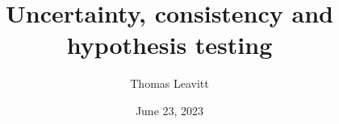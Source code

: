 \documentclass[table, xcolor = {dvipsnames}, 9pt]{beamer}
\title[]{Uncertainty, consistency and hypothesis testing} %
\author{Thomas Leavitt} %
\institute[] %
{
\medskip
\textit{} %
}
\date{June 23, 2023} %
\theoremstyle{plain}
\begin{document}
\begin{frame}
\titlepage %
\end{frame}


\end{document}
